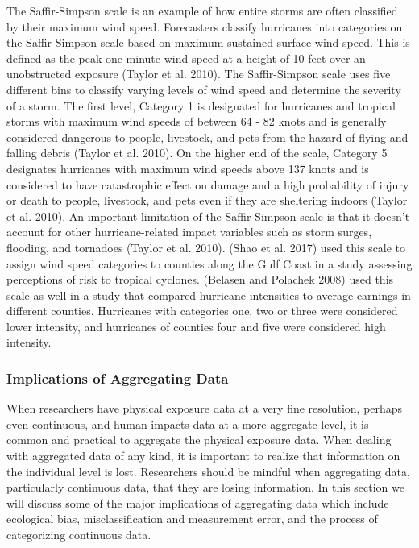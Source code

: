 \documentclass[
]{article}
\begin{document}
The Saffir-Simpson scale is an example of how entire storms are often
classified by their maximum wind speed. Forecasters classify hurricanes
into categories on the Saffir-Simpson scale based on maximum sustained
surface wind speed. This is defined as the peak one minute wind speed at
a height of 10 feet over an unobstructed exposure (Taylor et al. 2010).
The Saffir-Simpson scale uses five different bins to classify varying
levels of wind speed and determine the severity of a storm. The first
level, Category 1 is designated for hurricanes and tropical storms with
maximum wind speeds of between 64 - 82 knots and is generally considered
dangerous to people, livestock, and pets from the hazard of flying and
falling debris (Taylor et al. 2010). On the higher end of the scale,
Category 5 designates hurricanes with maximum wind speeds above 137
knots and is considered to have catastrophic effect on damage and a high
probability of injury or death to people, livestock, and pets even if
they are sheltering indoors (Taylor et al. 2010). An important
limitation of the Saffir-Simpson scale is that it doesn't account for
other hurricane-related impact variables such as storm surges, flooding,
and tornadoes (Taylor et al. 2010). (Shao et al. 2017) used this scale
to assign wind speed categories to counties along the Gulf Coast in a
study assessing perceptions of risk to tropical cyclones. (Belasen and
Polachek 2008) used this scale as well in a study that compared
hurricane intensities to average earnings in different counties.
Hurricanes with categories one, two or three were considered lower
intensity, and hurricanes of counties four and five were considered high
intensity.

\hypertarget{implications-of-aggregating-data}{%
\subsubsection{Implications of Aggregating
Data}\label{implications-of-aggregating-data}}

When researchers have physical exposure data at a very fine resolution,
perhaps even continuous, and human impacts data at a more aggregate
level, it is common and practical to aggregate the physical exposure
data. When dealing with aggregated data of any kind, it is important to
realize that information on the individual level is lost. Researchers
should be mindful when aggregating data, particularly continuous data,
that they are losing information. In this section we will discuss some
of the major implications of aggregating data which include ecological
bias, misclassification and measurement error, and the process of
categorizing continuous data.
\end{document}
